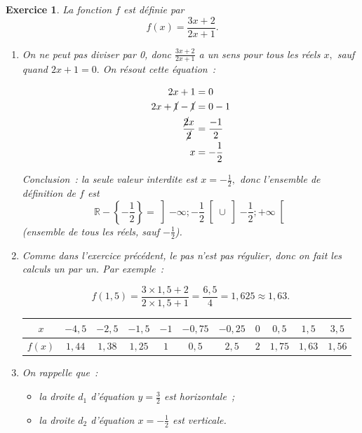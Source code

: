\documentclass[10pt]{article}
\newtheorem{exo}{Exercice}
\begin{document}
\begin{exo}
La fonction $f$ est définie par \[f\left(x\right)=\frac{3x+2}{2x+1}.\]

\begin{enumerate}
\item On ne peut pas diviser par 0, donc $\frac{3x+2}{2x+1}$ a un sens pour tous les réels $x,$ sauf quand $2x+1=0.$ On résout cette équation~:

\begin{align*}
2x+1&=0\\
2x+\cancel{1}-\cancel{1}&=0-1\\
\frac{\cancel{2}x}{\cancel{2}}&=\frac{-1}{2}\\
x&=-\frac{1}{2}
\end{align*}

Conclusion~: la seule valeur interdite est $x=-\frac{1}{2},$ donc l'ensemble de définition de $f$ est \[\mathbb{R}-\left\{-\frac{1}{2}\right\}=\left]-\infty;-\frac{1}{2}\right[\cup\left]-\frac{1}{2};+\infty\right[\] (ensemble de tous les réels, sauf $-\frac{1}{2}$).

\item Comme dans l'exercice précédent, le pas n'est pas régulier, donc on fait les calculs un par un. Par exemple~:

\[f(1,5)=\frac{3\times 1,5+2}{2\times 1,5+1}=\frac{6,5}{4}=1,625\approx 1,63.\]

\begin{center}
\begin{tabular}{|c|c|c|c|c|c|c|c|c|c|c|}
\hline
	$x$&$-4,5$ &$-2,5$ &$-1,5$ &$-1$ &$-0,75$& $-0,25$ &$0$ &$0,5$ &$1,5$ &$3,5$	\\\hline

$f(x)$&$1,44$&$1,38$&$1,25$&$1$&$0,5$&$2,5$&$2$&$1,75$&$1,63$&$1,56$\\\hline
\end{tabular}
\end{center}

\medskip

\item On rappelle que~:
\begin{itemize}
\item[\textbullet] la droite $d_1$ d'équation $y=\frac{3}{2}$ est horizontale~;
\item[\textbullet] la droite $d_2$ d'équation $x=-\frac{1}{2}$ est verticale.
\end{itemize}

\medskip



\end{enumerate}
\end{exo}
\end{document}
